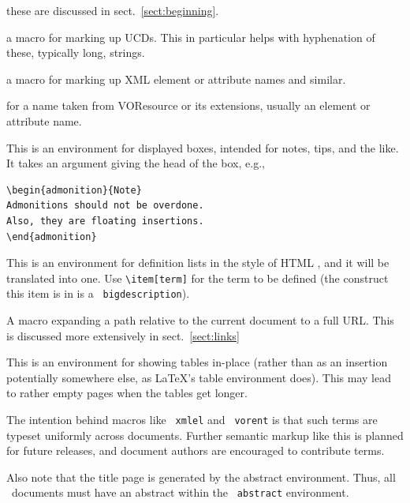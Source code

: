 \documentclass[11pt,a4paper]{ivoa}
\newcommand{\texword}[1]{\texttt{\color{texcolor} #1}}
\begin{document}
\begin{bigdescription}
\item[\texword{author}, \texword{previousversion}, \texword{ivoagroup}] these are discussed
in sect.~\ref{sect:beginning}.
\item[\texword{ucd}] a macro for marking up UCDs.  This in particular
helps with hyphenation of these, typically long, strings.
\item[\texword{xmlel}] a macro for marking up XML element or attribute
names and similar.
\item[\texword{vorent}] for a name taken from VOResource or its
extensions, usually an
element or attribute name.
\item[\texword{admonition}] This is an environment for
displayed boxes, intended for notes, tips, and the like.
It takes an argument giving the head of the box, e.g.,

\begin{lstlisting}
\begin{admonition}{Note}
Admonitions should not be overdone.
Also, they are floating insertions.
\end{admonition}
\end{lstlisting}
\item[\texword{bigdescription}] This is an environment for definition
lists in the style of HTML , and it will be translated into
one.  Use \verb|\item[term]| for the term to be defined
(the construct this item is in is a \texword{bigdescription}).
\item[\texword{auxilaryurl}] A macro expanding a path relative to the
current document to a full URL.  This is discussed more extensively in
sect.~\ref{sect:links}
\item[\texword{inlinetable}] This is an environment for showing tables
in-place (rather than as an insertion potentially somewhere else, as
LaTeX's table environment does).  This may lead to rather empty pages
when the tables get longer.
\end{bigdescription}

The intention behind macros like \texword{xmlel} and \texword{vorent} is
that such terms are typeset uniformly across documents.  Further
semantic markup like this is planned for future releases, and document
authors are encouraged to contribute terms.

Also note that the title page is generated by the abstract environment.
Thus, all \ivoatex\ documents must have an abstract within the
\texword{abstract} environment.
\end{document}

